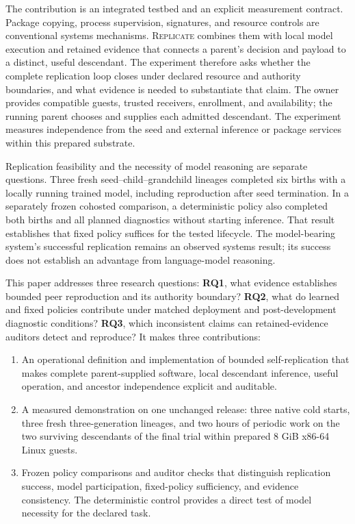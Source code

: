 \documentclass[11pt,letterpaper]{article}
\newcommand{\sys}{\textsc{Replicate}}
\begin{document}
The contribution is an integrated testbed and an explicit measurement contract.
Package copying, process supervision, signatures, and resource controls are
conventional systems mechanisms. \sys{} combines them with local model
execution and retained evidence that connects a parent's decision and payload
to a distinct, useful descendant. The experiment therefore asks whether the
complete replication loop closes under declared resource and authority
boundaries, and what evidence is needed to substantiate that claim. The owner
provides compatible guests, trusted receivers, enrollment, and availability;
the running parent chooses and supplies each admitted descendant. The
experiment measures independence from the seed and external inference or
package services within this prepared substrate.

Replication feasibility and the necessity of model reasoning are separate
questions. Three fresh seed--child--grandchild lineages completed six births
with a locally running trained model, including reproduction after seed
termination. In a separately frozen cohosted comparison, a deterministic policy
also completed both births and all planned diagnostics without starting
inference. That result establishes that fixed policy suffices for the tested
lifecycle. The model-bearing system's successful replication remains an
observed systems result; its success does not establish an advantage from
language-model reasoning.

This paper addresses three research questions: \textbf{RQ1}, what evidence
establishes bounded peer reproduction and its authority boundary?
\textbf{RQ2}, what do learned and fixed policies contribute under matched
deployment and post-development diagnostic conditions? \textbf{RQ3}, which
inconsistent claims can retained-evidence auditors detect and reproduce?
It makes three contributions:
\begin{enumerate}
\item An operational definition and implementation of bounded self-replication
that makes complete parent-supplied software, local descendant inference,
useful operation, and ancestor independence explicit and auditable.
\item A measured demonstration on one unchanged release: three native cold
starts, three fresh three-generation lineages, and two hours of periodic work
on the two surviving descendants of the final trial within prepared 8 GiB
x86-64 Linux guests.
\item Frozen policy comparisons and auditor checks that distinguish replication
success, model participation, fixed-policy sufficiency, and evidence consistency.
The deterministic control provides a direct test of model necessity for the
declared task.
\end{enumerate}
\end{document}
